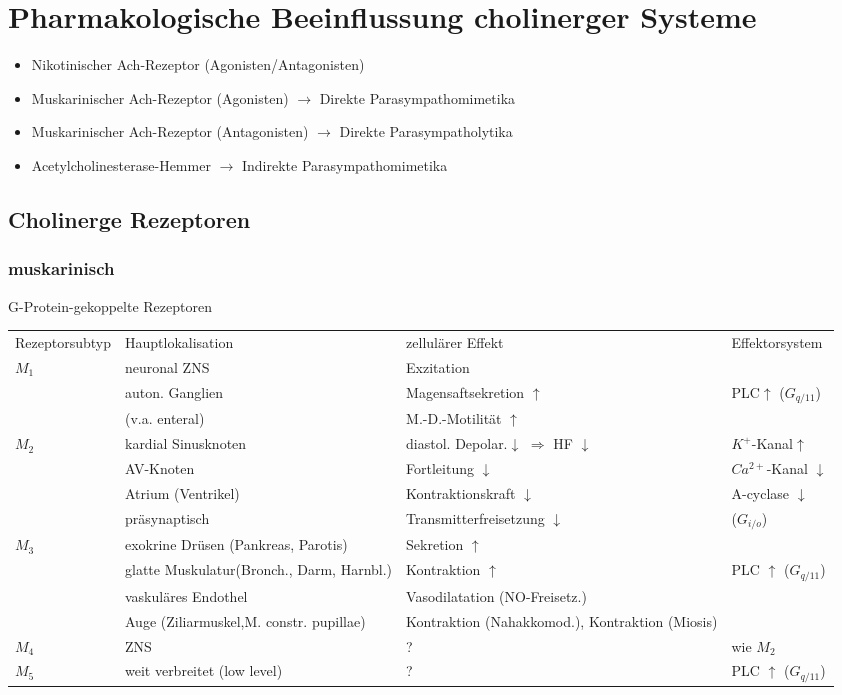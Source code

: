 \documentclass[10pt,a4paper]{report}
\begin{document}
\section{Pharmakologische Beeinflussung cholinerger Systeme}
\begin{itemize}
	\item Nikotinischer Ach-Rezeptor (Agonisten/Antagonisten)
	\item Muskarinischer Ach-Rezeptor (Agonisten) $\rightarrow$ Direkte Parasympathomimetika
 	\item Muskarinischer Ach-Rezeptor (Antagonisten) 
   $\rightarrow$ Direkte Parasympatholytika
	\item Acetylcholinesterase-Hemmer 
   $\rightarrow$ Indirekte Parasympathomimetika
\end{itemize}
\subsection{Cholinerge Rezeptoren}
\subsubsection{muskarinisch}
G-Protein-gekoppelte Rezeptoren\mbox{} \\
\begin{tabularx}{\textwidth}{XXXX}
Rezeptorsubtyp&Hauptlokalisation&zellulärer Effekt&Effektorsystem\\
$M_1$&neuronal ZNS&Exzitation &\\
&auton. Ganglien&Magensaftsekretion $\uparrow$&PLC$\uparrow$ ($G_{q/11}$)\\
&(v.a. enteral)&M.-D.-Motilität $\uparrow$&\\
$M_2$&kardial Sinusknoten&diastol. Depolar.$\downarrow$ $\Rightarrow$ HF $\downarrow$ &$K^+$-Kanal$\uparrow$\\
&AV-Knoten&Fortleitung $\downarrow$&$Ca^{2+}$-Kanal $\downarrow$\\ 
&Atrium (Ventrikel)&Kontraktionskraft $\downarrow$&A-cyclase $\downarrow$\\
&präsynaptisch&Transmitterfreisetzung $\downarrow$&($G_{i/o}$)\\
$M_3$&exokrine Drüsen (Pankreas, Parotis)&Sekretion $\uparrow$&\\
&glatte Muskulatur(Bronch., Darm, Harnbl.)&Kontraktion $\uparrow$&PLC $\uparrow$ ($G_{q/11}$)\\
&vaskuläres Endothel&Vasodilatation (NO-Freisetz.)&\\
&Auge (Ziliarmuskel,M. constr. pupillae)&Kontraktion (Nahakkomod.),  Kontraktion (Miosis)&\\
$M_4$&ZNS&?&wie $M_2$\\
$M_5$&weit verbreitet (low level)&?&PLC $\uparrow$ ($G_{q/11}$)\\
\end{tabularx}
\end{document}
